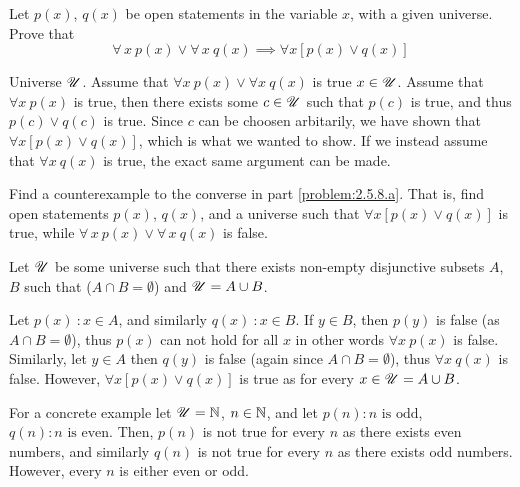 \documentclass[a4paper, english, 12pt]{article} %
\begin{document}

\begin{problem}[8]
  \begin{subproblem}
    \label{problem:2.5.8.a}
    Let $p(x)$, $q(x)$ be open statements in the variable $x$, with a given
    universe. Prove that
    \begin{equation*}
      \forall\,x \ p(x) \vee \forall \, x \ q(x)
      \implies
      \forall x [p(x) \vee q(x)]
    \end{equation*}
  \end{subproblem}
\end{problem}

\begin{answer}
  Universe $\mathscr{U}$.
  Assume that $\forall x \ p(x) \vee \forall
  x \ q(x)$ is true $x \in \mathscr{U}$. Assume that $\forall x \ p(x)$ is true, then
  there exists some $c \in \mathscr{U}$ such that $p(c)$ is true, and thus $p(c) \vee q(c)$ is true. Since $c$ can be
  choosen arbitarily, we have shown that $\forall x [p(x) \vee q(x)]$, which is
  what we wanted to show. If we instead assume that $\forall x \ q(x)$ is true,
  the exact same argument can be made.
\end{answer}

\begin{subproblem}
  Find a counterexample to the converse in part \ref{problem:2.5.8.a}. That is,
  find open statements $p(x)$, $q(x)$, and a universe such that $\forall x [p(x)
  \vee q(x)]$ is true, while $\forall\,x \ p(x) \vee \forall \, x \ q(x)$ is false.
\end{subproblem}

\begin{answer}
  Let $\mathscr{U}$ be some universe such that there exists non-empty disjunctive subsets $A$, $B$
  such that ($A \cap B = \emptyset$) and $\mathscr{U} = A \cup B$.

  Let $p(x)\ \colon x \in A$, and similarly $q(x)\ \colon x \in B$. If
  $y \in B $, then $p(y)$ is false (as $A \cap B = \emptyset$), thus $p(x)$ can
  not hold for all $x$ in other words $\forall x
  \ p(x)$ is false. Similarly, let $y \in A$ then $q(y)$ is false (again since
  $A \cap B = \emptyset$), thus $\forall x \ q(x)$ is false.
  However, $\forall x [p(x) \vee q(x)]$ is true as for every $x \in \mathscr{U} = A \cup
  B$. \medskip

  For a concrete example let $\mathscr{U} = \mathbb{N}$, $n \in \mathbb{N}$, and let $p(n) \colon n \text{ is
    odd}$, $q(n) \colon n \text{ is even}$. Then, $p(n)$ is not true for every
  $n$ as there exists even numbers, and similarly $q(n)$ is not true for every
  $n$ as there exists odd numbers. However, every $n$ is either
  even or odd. 
\end{answer}
\end{document}
